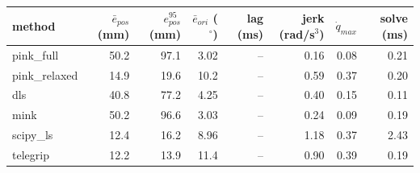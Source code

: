 \begin{tabular}{lrrrrrrr}
\toprule
method & $\bar{e}_{pos}$ (mm) & $e_{pos}^{95}$ (mm) & $\bar{e}_{ori}$ ($^\circ$) & lag (ms) & jerk (rad/s$^3$) & $\dot{q}_{max}$ & solve (ms) \\
\midrule
pink\_full & 50.2 & 97.1 & 3.02 & -- & 0.16 & 0.08 & 0.21 \\
pink\_relaxed & 14.9 & 19.6 & 10.2 & -- & 0.59 & 0.37 & 0.20 \\
dls & 40.8 & 77.2 & 4.25 & -- & 0.40 & 0.15 & 0.11 \\
mink & 50.2 & 96.6 & 3.03 & -- & 0.24 & 0.09 & 0.19 \\
scipy\_ls & 12.4 & 16.2 & 8.96 & -- & 1.18 & 0.37 & 2.43 \\
telegrip & 12.2 & 13.9 & 11.4 & -- & 0.90 & 0.39 & 0.19 \\
\bottomrule
\end{tabular}
